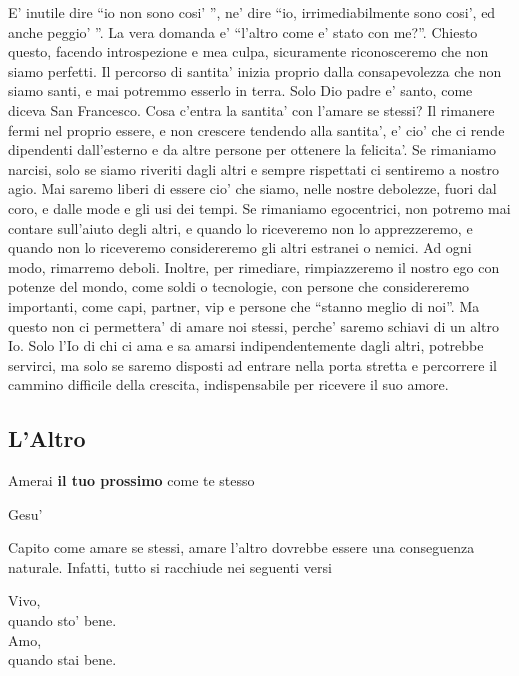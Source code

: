E' inutile dire ``io non sono cosi' '', ne' dire ``io, irrimediabilmente sono cosi', ed anche peggio' ''. La vera domanda e' ``l'altro come e' stato con me?''. Chiesto questo, facendo introspezione e mea culpa, sicuramente riconosceremo che non siamo perfetti. Il percorso di santita' inizia proprio dalla consapevolezza che non siamo santi, e mai potremmo esserlo in terra. Solo Dio padre e' santo, come diceva San Francesco. 
Cosa c'entra la santita' con l'amare se stessi? Il rimanere fermi nel proprio essere, e non crescere tendendo alla santita', e' cio' che ci rende dipendenti dall'esterno e da altre persone per ottenere la felicita'. Se rimaniamo narcisi, solo se siamo riveriti dagli altri e sempre rispettati ci sentiremo a nostro agio. Mai saremo liberi di essere cio' che siamo, nelle nostre debolezze, fuori dal coro, e dalle mode e gli usi dei tempi. Se rimaniamo egocentrici, non potremo mai contare sull'aiuto degli altri, e quando lo riceveremo non lo apprezzeremo, e quando non lo riceveremo considereremo gli altri estranei o nemici. Ad ogni modo, rimarremo deboli. Inoltre, per rimediare, rimpiazzeremo il nostro ego con potenze del mondo, come soldi o tecnologie, con persone che considereremo importanti, come capi, partner, vip e persone che ``stanno meglio di noi''. Ma questo non ci permettera' di amare noi stessi, perche' saremo schiavi di un altro Io. Solo l'Io di chi ci ama e sa amarsi indipendentemente dagli altri, potrebbe servirci, ma solo se saremo disposti ad entrare nella porta stretta e percorrere il cammino difficile della crescita, indispensabile per ricevere il suo amore.

\subsection{L'Altro}
\label{altrui}
\epigraph{
    Amerai \textbf{il tuo prossimo} come te stesso
 }{Gesu'}

Capito come amare se stessi, amare l'altro dovrebbe essere una conseguenza naturale. Infatti, tutto si racchiude nei seguenti versi

\begin{poem}
    Vivo,\\
    quando sto' bene.\\
    Amo,\\
    quando stai bene.\\
    \leavevmode\\
\end{poem}

